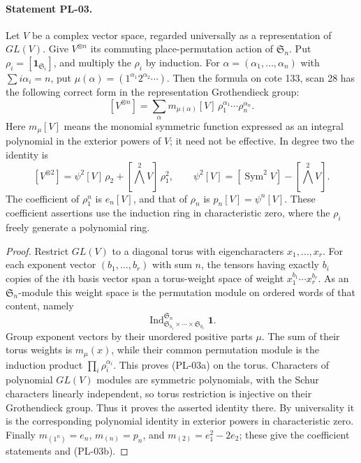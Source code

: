 \paragraph{Statement PL-03.}
Let $V$ be a complex vector space, regarded universally as a representation of
$GL(V)$. Give $V^{\otimes n}$ its commuting place-permutation action of
$\mathfrak S_n$. Put $\rho_i=[\mathbf1_{\mathfrak S_i}]$, and multiply the
$\rho_i$ by induction. For $\alpha=(\alpha_1,\ldots,\alpha_n)$ with
$\sum i\alpha_i=n$, put $\mu(\alpha)=(1^{\alpha_1}2^{\alpha_2}\cdots)$.
Then the formula on cote 133, scan 28 has the following correct form in the
representation Grothendieck group:
\[
 [V^{\otimes n}]=
 \sum_{\alpha}m_{\mu(\alpha)}[V]\,
          \rho_1^{\alpha_1}\cdots\rho_n^{\alpha_n}.
 \tag{PL-03a}
\]
Here $m_\mu[V]$ means the monomial symmetric function expressed as an
integral polynomial in the exterior powers of $V$; it need not be effective.
In degree two the identity is
\[
 [V^{\otimes2}]=\psi^2[V]\,\rho_2+[\bigwedge^2V]\,\rho_1^2,
 \qquad \psi^2[V]=[\operatorname{Sym}^2V]-[\bigwedge^2V].
 \tag{PL-03b}
\]
The coefficient of $\rho_1^n$ is $e_n[V]$, and that of $\rho_n$ is
$p_n[V]=\psi^n[V]$. These coefficient assertions use the induction ring in
characteristic zero, where the $\rho_i$ freely generate a polynomial ring.

\begin{proof}
Restrict $GL(V)$ to a diagonal torus with eigencharacters $x_1,\ldots,x_r$.
For each exponent vector $(b_1,\ldots,b_r)$ with sum $n$, the tensors having
exactly $b_i$ copies of the $i$th basis vector span a torus-weight space of
weight $x_1^{b_1}\cdots x_r^{b_r}$. As an $\mathfrak S_n$-module this weight
space is the permutation module on ordered words of that content, namely
\[
 \operatorname{Ind}_{\mathfrak S_{b_1}\times\cdots\times\mathfrak S_{b_r}}
              ^{\mathfrak S_n}\mathbf1.
\]
Group exponent vectors by their unordered positive parts $\mu$.
The sum of their torus weights is $m_\mu(x)$, while their common permutation
module is the induction product $\prod_i\rho_i^{\alpha_i}$.
This proves (PL-03a) on the torus. Characters of polynomial $GL(V)$ modules
are symmetric polynomials, with the Schur characters linearly independent,
so torus restriction is injective on their Grothendieck group. Thus it proves
the asserted identity there. By universality it is the corresponding
polynomial identity in exterior powers in characteristic zero.
Finally $m_{(1^n)}=e_n$, $m_{(n)}=p_n$, and
$m_{(2)}=e_1^2-2e_2$; these give the coefficient statements and (PL-03b).
\end{proof}

